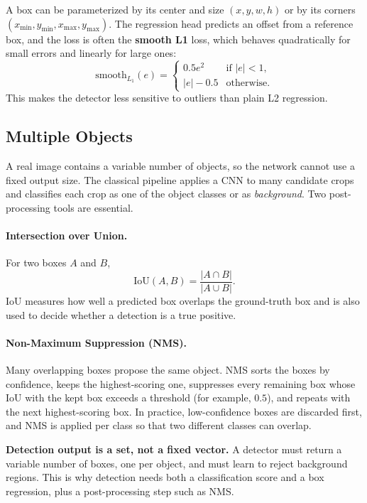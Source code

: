 A box can be parameterized by its center and size $(x,y,w,h)$ or by its corners $(x_{\min},y_{\min},x_{\max},y_{\max})$. The regression head predicts an offset from a reference box, and the loss is often the \textbf{smooth L1} loss, which behaves quadratically for small errors and linearly for large ones:
\begin{equation}
    \mathrm{smooth}_{L_1}(e) =
    \begin{cases}
        0.5 e^2 & \text{if } |e| < 1, \\
        |e| - 0.5 & \text{otherwise}.
    \end{cases}
\end{equation}
This makes the detector less sensitive to outliers than plain L2 regression.

\subsection{Multiple Objects}

A real image contains a variable number of objects, so the network cannot use a fixed output size. The classical pipeline applies a CNN to many candidate crops and classifies each crop as one of the object classes or as \emph{background}. Two post-processing tools are essential.

\paragraph{Intersection over Union.} For two boxes $A$ and $B$,
\begin{equation}
    \mathrm{IoU}(A,B) = \frac{|A \cap B|}{|A \cup B|}.
\end{equation}
IoU measures how well a predicted box overlaps the ground-truth box and is also used to decide whether a detection is a true positive.

\paragraph{Non-Maximum Suppression (NMS).} Many overlapping boxes propose the same object. NMS sorts the boxes by confidence, keeps the highest-scoring one, suppresses every remaining box whose IoU with the kept box exceeds a threshold (for example, $0.5$), and repeats with the next highest-scoring box. In practice, low-confidence boxes are discarded first, and NMS is applied per class so that two different classes can overlap.

\begin{keywordbox}
\textbf{Detection output is a set, not a fixed vector.} A detector must return a variable number of boxes, one per object, and must learn to reject background regions. This is why detection needs both a classification score and a box regression, plus a post-processing step such as NMS.
\end{keywordbox}

